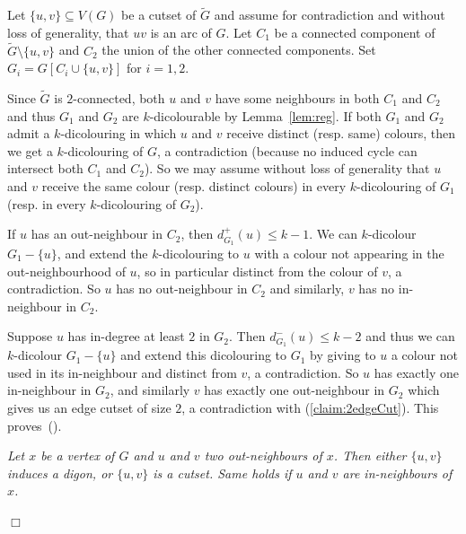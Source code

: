\documentclass[11pt]{article}
\newcommand{\sm}{\setminus}
\newcounter{claim}
\newenvironment{proof}[1][]%
 {\noindent {\setcounter{claim}{0}\sc proof ---
   }{#1}{}}{\hfill$\Box$\vspace{2ex}}
\newenvironment{claim}[1][]%
{\refstepcounter{claim}\vspace{1ex}\noindent{(\it\arabic{claim}){#1}{}}\it}{\vspace{1ex}}
\newenvironment{proofclaim}[1][]%
	{\noindent {}{#1}{}}{ This proves~(\arabic{claim}).\vspace{2ex}}
\begin{document}
\begin{proof}
\begin{proofclaim}
Let $\{u,v\} \subseteq V(G)$ be a cutset of $\tilde{G}$ and assume for contradiction and without loss of generality, that $uv$ is an arc of $G$. 
Let $C_{1}$ be a connected component of $\tilde G \sm \{u,v\}$ and $C_2$ the union of the other connected components.  Set $G_{i} = G[C_{i} \cup \{u, v\}]$ for $i=1,2$.

Since $\tilde{G}$ is $2$-connected, both $u$ and $v$ have some neighbours in both $C_1$ and $C_2$ and thus $G_1$ and $G_2$ are $k$-dicolourable by Lemma~\ref{lem:reg}.
 If both $G_1$ and $G_2$ admit a $k$-dicolouring in which $u$ and $v$ receive distinct (resp. same) colours, then we get a $k$-dicolouring of $G$, a contradiction (because no induced cycle can intersect both $C_1$ and $C_2$). 
 So we may assume without loss of generality that $u$ and $v$ receive the same colour (resp. distinct colours) in every $k$-dicolouring of $G_1$ (resp. in every $k$-dicolouring of $G_2$). 

If $u$ has an out-neighbour in $C_2$, then $d_{G_1}^+(u) \leq k-1$. We can $k$-dicolour $G_1 - \{u\}$, and extend the $k$-dicolouring to $u$ with a colour not appearing in the out-neighbourhood of $u$, so in particular distinct from the colour of $v$, a contradiction.
So $u$ has no out-neighbour in $C_2$ and similarly, $v$ has no in-neighbour in $C_2$. 

Suppose $u$ has in-degree at least $2$ in $G_{2}$. Then $d_{G_1}^-(u) \leq k-2$ and thus we can $k$-dicolour $G_1 - \{u\}$ and extend this dicolouring to $G_1$ by giving to $u$ a colour not used in its in-neighbour and distinct from $v$, a contradiction. 
So $u$ has exactly one in-neighbour in $G_2$, and similarly $v$ has exactly one out-neighbour in $G_2$ which gives us an edge cutset of size $2$, a contradiction with (\ref{claim:2edgeCut}).
\end{proofclaim}

\begin{claim}\label{claim:lovasz}
Let $x$ be a vertex of $G$ and $u$ and $v$ two out-neighbours of $x$. Then either $\{u,v\}$ induces a digon, or $\{u,v\}$ is a cutset. Same holds if $u$ and $v$ are in-neighbours of $x$. 
\end{claim}


\end{proof}
\end{document}
